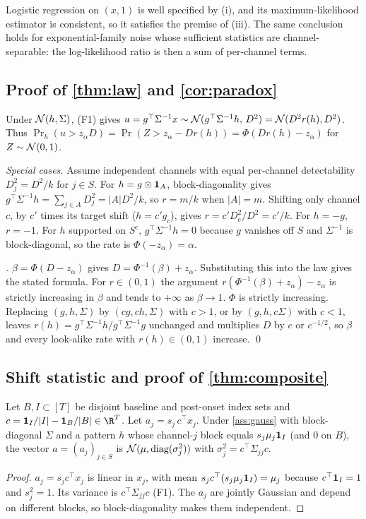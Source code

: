 \begin{remark}
Logistic regression on $(x,1)$ is well specified by (i), and its maximum-likelihood estimator is consistent, so it satisfies the premise of (iii). The same conclusion holds for exponential-family noise whose sufficient statistics are channel-separable: the log-likelihood ratio is then a sum of per-channel terms.
\end{remark}

\subsection{Proof of \texorpdfstring{\cref{thm:law}}{Theorem 2} and \texorpdfstring{\cref{cor:paradox}}{Corollary 3}}
Under $\mathcal{N}(h,\Sigma)$, (F1) gives $u=g^\top\Sigma^{-1}x\sim\mathcal{N}(g^\top\Sigma^{-1}h,\,D^2)=\mathcal{N}(D^2r(h),D^2)$. Thus $\Pr_h(u>z_\alpha D)=\Pr(Z>z_\alpha-Dr(h))=\Phi(Dr(h)-z_\alpha)$ for $Z\sim\mathcal{N}(0,1)$.

\emph{Special cases.} Assume independent channels with equal per-channel detectability $D_j^2=D^2/k$ for $j\in S$. For $h=g\odot\mathbf{1}_A$, block-diagonality gives $g^\top\Sigma^{-1}h=\sum_{j\in A}D_j^2=|A|D^2/k$, so $r=m/k$ when $|A|=m$. Shifting only channel $c$, by $c'$ times its target shift ($h=c'g_c$), gives $r=c'D_c^2/D^2=c'/k$. For $h=-g$, $r=-1$. For $h$ supported on $S^c$, $g^\top\Sigma^{-1}h=0$ because $g$ vanishes off $S$ and $\Sigma^{-1}$ is block-diagonal, so the rate is $\Phi(-z_\alpha)=\alpha$.

\emph{.} $\beta=\Phi(D-z_\alpha)$ gives $D=\Phi^{-1}(\beta)+z_\alpha$. Substituting this into the law gives the stated formula. For $r\in(0,1)$ the argument $r(\Phi^{-1}(\beta)+z_\alpha)-z_\alpha$ is strictly increasing in $\beta$ and tends to $+\infty$ as $\beta\to1$. $\Phi$ is strictly increasing. Replacing $(g,h,\Sigma)$ by $(cg,ch,\Sigma)$ with $c>1$, or by $(g,h,c\Sigma)$ with $c<1$, leaves $r(h)=g^\top\Sigma^{-1}h/g^\top\Sigma^{-1}g$ unchanged and multiplies $D$ by $c$ or $c^{-1/2}$, so $\beta$ and every look-alike rate with $r(h)\in(0,1)$ increase. \qed

\subsection{Shift statistic and proof of \texorpdfstring{\cref{thm:composite}}{Theorem 4}}
\begin{lemma}\label{lem:shift}
Let $B,I\subset[T]$ be disjoint baseline and post-onset index sets and $c=\1_I/|I|-\1_B/|B|\in\R^T$. Let $a_j=s_j\,c^\top x_j$. Under \cref{ass:gauss} with block-diagonal $\Sigma$ and a pattern $h$ whose channel-$j$ block equals $s_j\mu_j\mathbf{1}_I$ (and $0$ on $B$), the vector $a=(a_j)_{j\in S}$ is $\mathcal{N}(\mu,\mathrm{diag}(\sigma_j^2))$ with $\sigma_j^2=c^\top\Sigma_{jj}c$.
\end{lemma}
\begin{proof}
$a_j=s_jc^\top x_j$ is linear in $x_j$, with mean $s_jc^\top(s_j\mu_j\mathbf{1}_I)=\mu_j$ because $c^\top\mathbf{1}_I=1$ and $s_j^2=1$. Its variance is $c^\top\Sigma_{jj}c$ (F1). The $a_j$ are jointly Gaussian and depend on different blocks, so block-diagonality makes them independent.
\end{proof}


